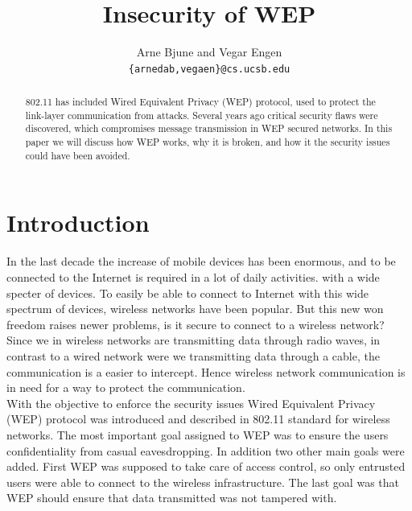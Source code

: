\documentclass[twocolumn]{IEEEtran}
\begin{document}
\title{Insecurity of WEP}


\author{Arne Bjune and Vegar Engen \\ \texttt{\{arnedab,vegaen\}@cs.ucsb.edu}}


\maketitle

\begin{abstract}
802.11 has included Wired Equivalent Privacy (WEP) protocol, used to protect the 
link-layer communication from attacks. Several years ago critical 
security flaws were discovered, which compromises message transmission in WEP secured networks. 
In this paper we will discuss how WEP works, why it is broken, and how it the security issues
could have been avoided.
\end{abstract}

\section {Introduction}
\label{sec:introduction}


In the last decade the increase of mobile devices has been enormous, and to be connected to 
the Internet is required in a lot of daily activities.  with a wide specter of devices. To easily
be able to connect to Internet with this wide spectrum of devices, wireless networks have been
popular. But this new won freedom raises newer problems, is it secure to connect to a wireless
network? Since we in wireless networks are transmitting data through radio waves, in contrast to
a wired network were we transmitting data through a cable, the communication is a easier to 
intercept. Hence wireless network communication is in need for a way to protect 
the communication. \\


With the objective to enforce the security issues Wired Equivalent Privacy (WEP) protocol was 
introduced and described in 802.11 standard\cite{IEEE:Fast} for wireless networks. The most
important goal assigned to WEP was to ensure the users confidentiality from casual eavesdropping.
In addition two other main goals were added. First WEP was supposed to take care of access 
control, so only entrusted users were able to connect to the wireless infrastructure. The 
last goal was that WEP should ensure that data transmitted was not tampered with.   \\
\end{document}
